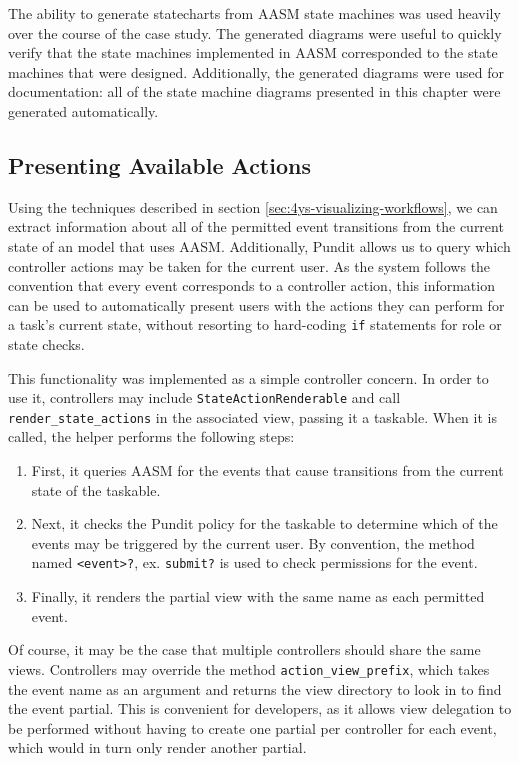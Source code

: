 \documentclass[document.tex]{subfiles}
\begin{document}
The ability to generate statecharts from AASM state machines was used heavily over the course of the case study. The generated diagrams were useful to quickly verify that the state machines implemented in AASM corresponded to the state machines that were designed. Additionally, the generated diagrams were used for documentation: all of the state machine diagrams presented in this chapter were generated automatically.


\FloatBarrier

\subsection {Presenting Available Actions}
\label {sec:4ys-available-actions}

Using the techniques described in section \ref{sec:4ys-visualizing-workflows},
we can extract information about all of the permitted event transitions from the current state of an model that uses AASM. Additionally, Pundit allows us to query which controller actions may be taken for the current user. As the system follows the convention that every event corresponds to a controller action, this information can be used to automatically present users with the actions they can perform for a task's current state, without resorting to hard-coding \verb!if! statements for role or state checks.

This functionality was implemented as a simple controller concern. In order to use it, controllers may include \verb!StateActionRenderable! and call 
\verb!render_state_actions! in the associated view, passing it a taskable. When it is called, the helper performs the following steps:
\begin{enumerate}
\item First, it queries AASM for the events that cause transitions from the current state of the taskable.
\item Next, it checks the Pundit policy for the taskable to determine which of the events may be triggered by the current user. By convention, the method named \verb!<event>?!, ex. \verb!submit?! is used to check permissions for the event.
\item Finally, it renders the partial view with the same name as each permitted event.
\end{enumerate}

Of course, it may be the case that multiple controllers should share the same views. Controllers may override the method \verb!action_view_prefix!, which takes the event name as an argument and returns the view directory to look in to find the event partial. This is convenient for developers, as it allows view delegation to be performed without having to create one partial per controller for each event, which would in turn only render another partial.
\end{document}
